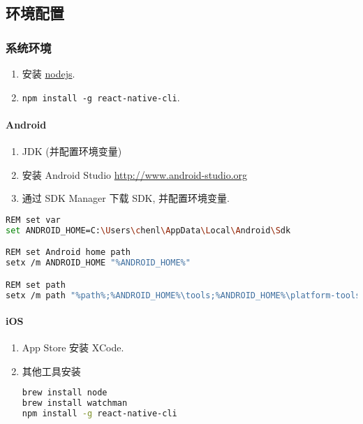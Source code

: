\subsection{环境配置}\label{ux73afux5883ux914dux7f6e}

\subsubsection{系统环境}\label{ux7cfbux7edfux73afux5883}

\begin{enumerate}
\def\labelenumi{\arabic{enumi}.}
\tightlist
\item
  安装 \href{https://nodejs.org}{nodejs}.
\item
  \lstinline!npm install -g react-native-cli!.
\end{enumerate}

\paragraph{Android}\label{android}

\begin{enumerate}
\def\labelenumi{\arabic{enumi}.}
\tightlist
\item
  JDK (并配置环境变量)
\item
  安装 Android Studio \url{http://www.android-studio.org}
\item
  通过 SDK Manager 下载 SDK, 并配置环境变量.
\end{enumerate}

\begin{lstlisting}[language=bash]
REM set var
set ANDROID_HOME=C:\Users\chenl\AppData\Local\Android\Sdk

REM set Android home path
setx /m ANDROID_HOME "%ANDROID_HOME%"

REM set path
setx /m path "%path%;%ANDROID_HOME%\tools;%ANDROID_HOME%\platform-tools;"
\end{lstlisting}

\paragraph{iOS}\label{ios}

\begin{enumerate}
\def\labelenumi{\arabic{enumi}.}
\item
  App Store 安装 XCode.
\item
  其他工具安装

\begin{lstlisting}[language=bash]
brew install node
brew install watchman
npm install -g react-native-cli
\end{lstlisting}
\end{enumerate}

